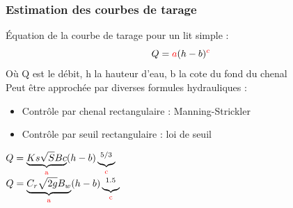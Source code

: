 \documentclass[compress,9pt]{beamer}
\begin{document}
	\begin{frame}
    	\frametitle{Estimation des courbes de tarage}
    		Équation de la courbe de tarage pour un lit simple : 
    		\begin{equation}
    			Q = \textcolor{red}{a}(h-b)^{\textcolor{red}c}
    		\end{equation}
    		Où Q est le débit, h la hauteur d'eau, b la cote du fond du chenal \\
		\vspace{1cm}
		Peut être approchée par diverses formules hydrauliques :
		\vfill
		\begin{minipage}{.4\textwidth}
			\begin{itemize}
				\item<2->[$\vartriangleright$] Contrôle par chenal rectangulaire : Manning-Strickler\\
				\vspace{0.5cm}
				\item<3->[$\vartriangleright$] Contrôle par seuil rectangulaire : loi de seuil
			\end{itemize}
		\end{minipage}
		\begin{minipage}{.55\textwidth}
			\begin{center}
%				
				 $Q = \underbrace{Ks\sqrt{S}Bc}_{\mathrm{\textcolor{red}{a}}}(h-b)\underbrace{^{5/3}}_{\mathrm{\textcolor{red}{c}}}$\\
				\vspace{0.5cm}
				\onslide<3-> $Q = \underbrace{C_r\sqrt{2g}B_w}_{\mathrm{\textcolor{red}{a}}}(h-b)\underbrace{^{1.5}}_{\mathrm{\textcolor{red}{c}}}$
			\end{center}
		\end{minipage}
    \end{frame}
    
\end{document}
